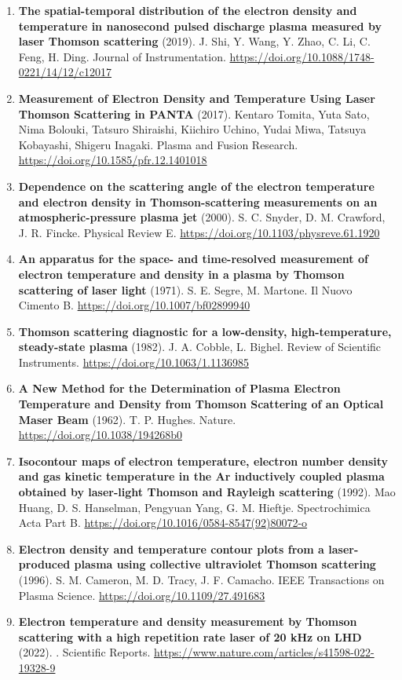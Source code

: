 \documentclass[11pt,a4paper]{article}
\begin{document}
\begin{enumerate}[leftmargin=1.4em]
\item \textbf{The spatial-temporal distribution of the electron density and temperature in nanosecond pulsed discharge plasma measured by laser Thomson scattering} (2019). J. Shi, Y. Wang, Y. Zhao, C. Li, C. Feng, H. Ding. Journal of Instrumentation. \url{https://doi.org/10.1088/1748-0221/14/12/c12017}
\item \textbf{Measurement of Electron Density and Temperature Using Laser Thomson Scattering in PANTA} (2017). Kentaro Tomita, Yuta Sato, Nima Bolouki, Tatsuro Shiraishi, Kiichiro Uchino, Yudai Miwa, Tatsuya Kobayashi, Shigeru Inagaki. Plasma and Fusion Research. \url{https://doi.org/10.1585/pfr.12.1401018}
\item \textbf{Dependence on the scattering angle of the electron temperature and electron density in Thomson-scattering measurements on an atmospheric-pressure plasma jet} (2000). S. C. Snyder, D. M. Crawford, J. R. Fincke. Physical Review E. \url{https://doi.org/10.1103/physreve.61.1920}
\item \textbf{An apparatus for the space- and time-resolved measurement of electron temperature and density in a plasma by Thomson scattering of laser light} (1971). S. E. Segre, M. Martone. Il Nuovo Cimento B. \url{https://doi.org/10.1007/bf02899940}
\item \textbf{Thomson scattering diagnostic for a low-density, high-temperature, steady-state plasma} (1982). J. A. Cobble, L. Bighel. Review of Scientific Instruments. \url{https://doi.org/10.1063/1.1136985}
\item \textbf{A New Method for the Determination of Plasma Electron Temperature and Density from Thomson Scattering of an Optical Maser Beam} (1962). T. P. Hughes. Nature. \url{https://doi.org/10.1038/194268b0}
\item \textbf{Isocontour maps of electron temperature, electron number density and gas kinetic temperature in the Ar inductively coupled plasma obtained by laser-light Thomson and Rayleigh scattering} (1992). Mao Huang, D. S. Hanselman, Pengyuan Yang, G. M. Hieftje. Spectrochimica Acta Part B. \url{https://doi.org/10.1016/0584-8547(92)80072-o}
\item \textbf{Electron density and temperature contour plots from a laser-produced plasma using collective ultraviolet Thomson scattering} (1996). S. M. Cameron, M. D. Tracy, J. F. Camacho. IEEE Transactions on Plasma Science. \url{https://doi.org/10.1109/27.491683}
\item \textbf{Electron temperature and density measurement by Thomson scattering with a high repetition rate laser of 20 kHz on LHD} (2022). . Scientific Reports. \url{https://www.nature.com/articles/s41598-022-19328-9}
\end{enumerate}
\end{document}
